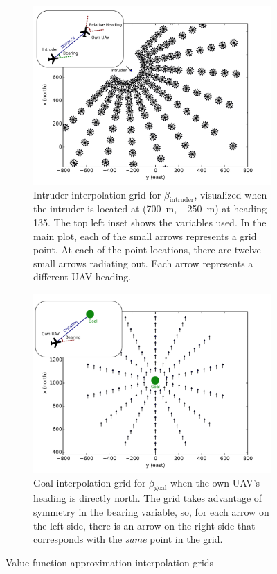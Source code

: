 \begin{figure}
    \centering
    \begin{subfigure}[t]{0.48\textwidth}
        \includegraphics[width=\textwidth]{media/intruder_grid_plus.pdf}
        \caption[Intruder interpolation grid]{Intruder interpolation grid for $\beta_\text{intruder}$, visualized when the intruder is located at (\SI{700}{m}, \SI{-250}{m}) at heading \num{135}. The top left inset shows the variables used. In the main plot, each of the small arrows represents a grid point. At each of the point locations, there are twelve small arrows radiating out. Each arrow represents a different UAV heading.}
        \label{fig:intrudergrid}
    \end{subfigure}
    \hfill
    \begin{subfigure}[t]{0.48\textwidth}
        \includegraphics[width=\textwidth]{media/goal_grid_plus.pdf}
        \caption[Goal interpolation grid]{Goal interpolation grid for $\beta_\text{goal}$ when the own UAV's heading is directly north. The grid takes advantage of symmetry in the bearing variable, so, for each arrow on the left side, there is an arrow on the right side that corresponds with the \emph{same} point in the grid.}
        \label{fig:goalgrid}
    \end{subfigure}
    \caption{Value function approximation interpolation grids}
\end{figure}

